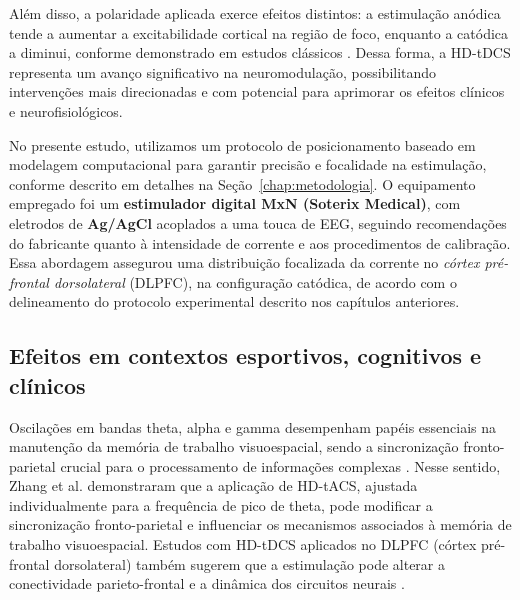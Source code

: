 Além disso, a polaridade aplicada exerce efeitos distintos: a estimulação anódica tende a aumentar a excitabilidade cortical na região de foco, enquanto a catódica a diminui, conforme demonstrado em estudos clássicos \cite{purpura1965intracellular, stagg2011physiological}. Dessa forma, a HD-tDCS representa um avanço significativo na neuromodulação, possibilitando intervenções mais direcionadas e com potencial para aprimorar os efeitos clínicos e neurofisiológicos.

No presente estudo, utilizamos um protocolo de posicionamento baseado em modelagem computacional para garantir precisão e focalidade na estimulação, conforme descrito em detalhes na Seção~\ref{chap:metodologia}. O equipamento empregado foi um \textbf{estimulador digital MxN (Soterix Medical)}, com eletrodos de \textbf{Ag/AgCl} acoplados a uma touca de EEG, seguindo recomendações do fabricante quanto à intensidade de corrente e aos procedimentos de calibração. Essa abordagem assegurou uma distribuição focalizada da corrente no \emph{córtex pré-frontal dorsolateral} (DLPFC), na configuração catódica, de acordo com o delineamento do protocolo experimental descrito nos capítulos anteriores.

\subsection{Efeitos em contextos esportivos, cognitivos e clínicos}

Oscilações em bandas theta, alpha e gamma desempenham papéis essenciais na manutenção da memória de trabalho visuoespacial, sendo a sincronização fronto-parietal crucial para o processamento de informações complexas \cite{fell2011phase, fries2015rhythms, palva2010neuronal}. Nesse sentido, Zhang et al. \cite{zhang2022theta} demonstraram que a aplicação de HD-tACS, ajustada individualmente para a frequência de pico de theta, pode modificar a sincronização fronto-parietal e influenciar os mecanismos associados à memória de trabalho visuoespacial. Estudos com HD-tDCS aplicados no DLPFC (córtex pré-frontal dorsolateral) também sugerem que a estimulação pode alterar a conectividade parieto-frontal e a dinâmica dos circuitos neurais \cite{arif2021high}.


